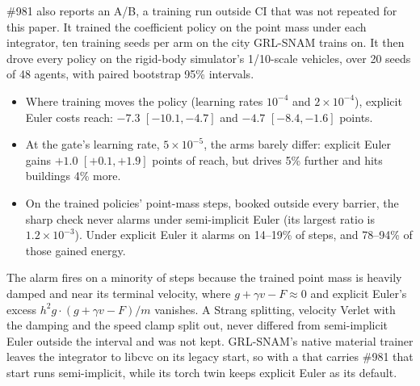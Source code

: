 \documentclass[11pt]{article}
\theoremstyle{remark}
\begin{document}
\#981 also reports an A/B, a training run outside CI that was not repeated for this paper. It
trained the coefficient policy on the point mass under each integrator, ten training seeds per arm
on the city GRL-SNAM trains on. It then drove every policy on the rigid-body simulator's 1/10-scale
vehicles, over 20 seeds of 48 agents, with paired bootstrap 95\% intervals.
\begin{itemize}
  \item Where training moves the policy (learning rates $10^{-4}$ and $2\times10^{-4}$), explicit
        Euler costs reach: $-7.3$ $[-10.1,-4.7]$ and $-4.7$ $[-8.4,-1.6]$ points.
  \item At the gate's learning rate, $5\times10^{-5}$, the arms barely differ: explicit Euler gains
        $+1.0$ $[+0.1,+1.9]$ points of reach, but drives 5\% further and hits buildings 4\% more.
  \item On the trained policies' point-mass steps, booked outside every barrier, the sharp check
        never alarms under semi-implicit Euler (its largest ratio is $1.2\times10^{-3}$). Under
        explicit Euler it alarms on 14--19\% of steps, and 78--94\% of those gained energy.
\end{itemize}
The alarm fires on a minority of steps because the trained point mass is heavily damped and near
its terminal velocity, where $g+\gamma v-F\approx0$ and explicit Euler's excess
$h^2g\cdot(g+\gamma v-F)/m$ vanishes. A Strang splitting, velocity Verlet with the damping and the
speed clamp split out, never differed from semi-implicit Euler outside the interval and was not
kept. GRL-SNAM's native material trainer leaves the integrator to libcvc on its legacy start, so
with a  that carries \#981 that start runs semi-implicit, while its torch twin keeps
explicit Euler as its default.
\end{document}
